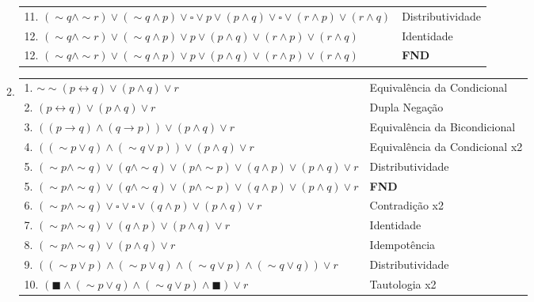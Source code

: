 \documentclass[12pt, a4paper,final]{article}
\begin{document}
\begin{enumerate}
\begin{enumerate}[label=(\alph*), leftmargin = 5mm]
\begin{tabular}{ll}
                    11. $(\sim q \wedge \sim r) \vee (\sim q \wedge p) \vee \square \vee p \vee (p \wedge q) \vee \square \vee (r \wedge p) \vee (r \wedge q)$ & Distributividade \\
                    12. $(\sim q \wedge \sim r) \vee (\sim q \wedge p) \vee p \vee (p \wedge q) \vee (r \wedge p) \vee (r \wedge q)$ & Identidade \\
                    12. $(\sim q \wedge \sim r) \vee (\sim q \wedge p) \vee p \vee (p \wedge q) \vee (r \wedge p) \vee (r \wedge q)$ & \textbf{FND} \\
                \end{tabular}
            
            \item 
            
                \begin{tabular}{ll}
                1. $\sim \sim (p \leftrightarrow q) \vee (p \wedge q) \vee r$ & Equivalência da Condicional \\
                2. $(p \leftrightarrow q) \vee (p \wedge q) \vee r$ & Dupla Negação \\
                3. $((p \rightarrow q) \wedge (q \rightarrow p)) \vee (p \wedge q) \vee r$ & Equivalência da Bicondicional \\
                4. $((\sim p \vee q) \wedge (\sim q \vee p)) \vee (p \wedge q) \vee r$ & Equivalência da Condicional x2 \\
                5. $(\sim p \wedge \sim q) \vee (q \wedge \sim q) \vee (p \wedge \sim p) \vee (q \wedge p) \vee (p \wedge q) \vee r$ & Distributividade \\
                5. $(\sim p \wedge \sim q) \vee (q \wedge \sim q) \vee (p \wedge \sim p) \vee (q \wedge p) \vee (p \wedge q) \vee r$ & \textbf{FND} \\
                6. $(\sim p \wedge \sim q) \vee \square \vee \square \vee (q \wedge p) \vee (p \wedge q) \vee r$ & Contradição x2 \\
                7. $(\sim p \wedge \sim q) \vee (q \wedge p) \vee (p \wedge q) \vee r$ & Identidade \\
                8. $(\sim p \wedge \sim q) \vee (p \wedge q) \vee r$ & Idempotência \\
                9. $((\sim p \vee p) \wedge (\sim p \vee q) \wedge (\sim q \vee p) \wedge (\sim q \vee q)) \vee r$ & Distributividade \\
                10. $(\blacksquare \wedge (\sim p \vee q) \wedge (\sim q \vee p) \wedge \blacksquare) \vee r$ & Tautologia x2 \\

\end{tabular}
\end{enumerate}
\end{enumerate}
\end{document}
